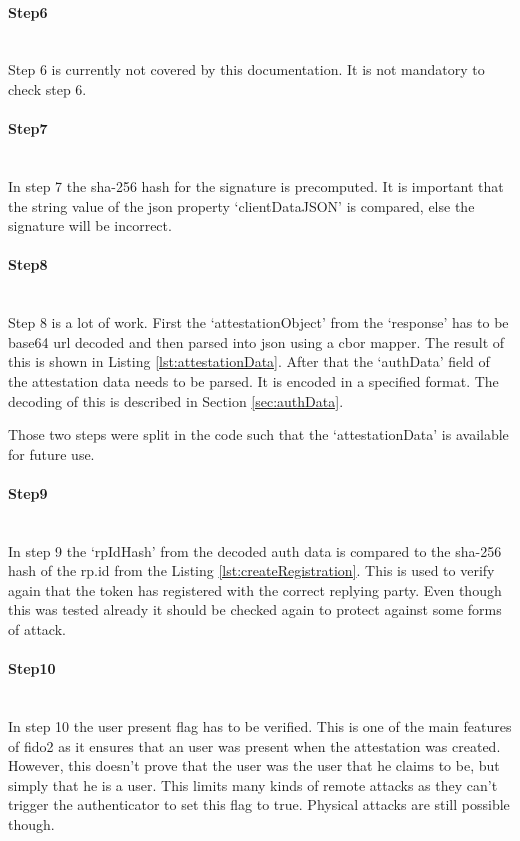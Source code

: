\documentclass[a4paper, 11pt]{scrartcl}
\begin{document}
\paragraph{Step6}\hfill \\ 
Step 6 is currently not covered by this documentation. It is not mandatory to check step 6.

\paragraph{Step7}\hfill \\ 
In step 7 the \gls{sha}-256 hash for the signature is precomputed. It is important that the string value of the json property `clientDataJSON' is compared, else the signature will be incorrect.

\paragraph{Step8}\hfill \\ 
Step 8 is a lot of work. First the `attestationObject' from the `response' has to be base64 url decoded and then parsed into \gls{json} using a \gls{cbor} mapper. The result of this is shown in Listing \ref{lst:attestationData}. After that the `authData' field of the attestation data needs to be parsed. It is encoded in a specified format. The decoding of this is described in Section \ref{sec:authData}. \cite{webauthn:authData}

Those two steps were split in the code such that the `attestationData' is available for future use.



\paragraph{Step9}\hfill \\ 
In step 9 the `rpIdHash' from the decoded auth data is compared to the \gls{sha}-256 hash of the rp.id from the Listing \ref{lst:createRegistration}. This is used to verify again that the token has registered with the correct replying party. Even though this was tested already it should be checked again to protect against some forms of attack. 

\paragraph{Step10}\hfill \\ 
In step 10 the user present flag has to be verified. This is one of the main features of \gls{fido2} as it ensures that an user was present when the attestation was created. However, this doesn't prove that the user was the user that he claims to be, but simply that he is a user. This limits many kinds of remote attacks as they can't trigger the authenticator to set this flag to true. Physical attacks are still possible though.
\end{document}
